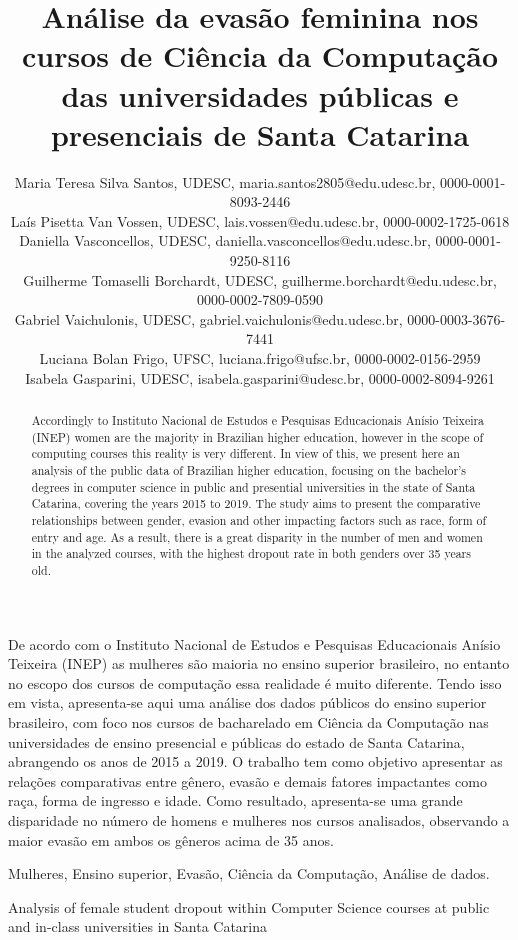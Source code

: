 \documentclass[a4paper]{article}
\title{Análise da evasão feminina nos cursos de Ciência da Computação das universidades públicas e presenciais de Santa Catarina}
\author{
\fontsize{10pt}{10pt}\selectfont
    Maria Teresa Silva Santos, UDESC, maria.santos2805@edu.udesc.br, 0000-0001-8093-2446
    \\
    \fontsize{10pt}{10pt}\selectfont
    Laís Pisetta Van Vossen, UDESC, lais.vossen@edu.udesc.br, 0000-0002-1725-0618
    \\
    \fontsize{10pt}{10pt}\selectfont
    Daniella Vasconcellos, UDESC, daniella.vasconcellos@edu.udesc.br, 0000-0001-9250-8116
    \\
    \fontsize{10pt}{10pt}\selectfont
    Guilherme Tomaselli Borchardt, UDESC, guilherme.borchardt@edu.udesc.br, 0000-0002-7809-0590 
    \\
    \fontsize{10pt}{10pt}\selectfont
    Gabriel Vaichulonis, UDESC, 	gabriel.vaichulonis@edu.udesc.br, 0000-0003-3676-7441
   \\
   \fontsize{10pt}{10pt}\selectfont
   Luciana Bolan Frigo, UFSC, luciana.frigo@ufsc.br, 0000-0002-0156-2959
   \\
  \fontsize{10pt}{10pt}\selectfont
   Isabela Gasparini, UDESC, isabela.gasparini@udesc.br, 0000-0002-8094-9261
   \\
}
\begin{document}
 

\maketitle

\begin{resumo} 

De acordo com o Instituto Nacional de Estudos e Pesquisas Educacionais Anísio Teixeira (INEP) as mulheres são maioria no ensino superior brasileiro, no entanto no escopo dos cursos de computação essa realidade é muito diferente. Tendo isso em vista, apresenta-se aqui uma análise dos dados públicos do ensino superior brasileiro, com foco nos cursos de bacharelado em Ciência da Computação nas universidades de ensino presencial e públicas do estado de Santa Catarina, abrangendo os anos de 2015 a 2019. O trabalho tem como objetivo apresentar as relações comparativas entre gênero, evasão e demais fatores impactantes como raça, forma de ingresso e idade. Como resultado, apresenta-se uma grande disparidade no número de homens e mulheres nos cursos analisados, observando a maior evasão em ambos os gêneros acima de 35 anos.
\end{resumo}

\begin{palavas-chave}
    Mulheres, Ensino superior, Evasão, Ciência da Computação, Análise de dados.
\end{palavas-chave}

\begin{englishtitle}
    Analysis of female student dropout within Computer Science courses at public and in-class universities in Santa Catarina
\end{englishtitle}

\begin{abstract}
Accordingly to Instituto Nacional de Estudos e Pesquisas Educacionais Anísio Teixeira (INEP) women are the majority in Brazilian higher education, however in the scope of computing courses this reality is very different. In view of this, we present here an analysis of the public data of Brazilian higher education, focusing on the bachelor's degrees in computer science in public and presential universities in the state of Santa Catarina, covering the years 2015 to 2019. The study aims to present the comparative relationships between gender, evasion and other impacting factors such as race, form of entry and age. As a result, there is a great disparity in the number of men and women in the analyzed courses, with the highest dropout rate in both genders over 35 years old.
\end{abstract}
\end{document}
